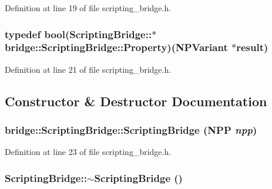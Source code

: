 Definition at line 19 of file scripting\_\-bridge.h.

\hypertarget{classbridge_1_1_scripting_bridge_a9063ac1ad0b4e1a439e954e7a505057d}{
\subsubsection[{Property}]{\setlength{\rightskip}{0pt plus 5cm}typedef bool(ScriptingBridge::$\ast$ {\bf bridge::ScriptingBridge::Property})(NPVariant $\ast$result)}}
\label{classbridge_1_1_scripting_bridge_a9063ac1ad0b4e1a439e954e7a505057d}


Definition at line 21 of file scripting\_\-bridge.h.



\subsection{Constructor \& Destructor Documentation}
\hypertarget{classbridge_1_1_scripting_bridge_a9f6cceea3738d76e33f47ba8ad5f72d9}{
\subsubsection[{ScriptingBridge}]{\setlength{\rightskip}{0pt plus 5cm}bridge::ScriptingBridge::ScriptingBridge (NPP {\em npp})}}
\label{classbridge_1_1_scripting_bridge_a9f6cceea3738d76e33f47ba8ad5f72d9}


Definition at line 23 of file scripting\_\-bridge.h.

\hypertarget{classbridge_1_1_scripting_bridge_ae6c311b5f9ffa0a578c7d8e41fa9c23c}{
\subsubsection[{$\sim$ScriptingBridge}]{\setlength{\rightskip}{0pt plus 5cm}ScriptingBridge::$\sim$ScriptingBridge ()}}
\label{classbridge_1_1_scripting_bridge_ae6c311b5f9ffa0a578c7d8e41fa9c23c}


